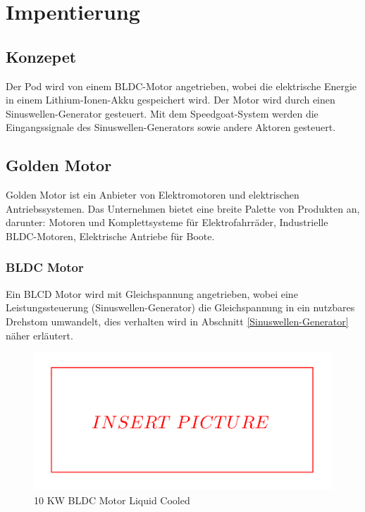 \chapter{Impentierung}

\section{Konzepet}
Der Pod wird von einem BLDC-Motor angetrieben, wobei die elektrische Energie in einem Lithium-Ionen-Akku gespeichert wird. Der Motor wird durch einen Sinuswellen-Generator gesteuert. Mit dem Speedgoat-System werden die Eingangssignale des Sinuswellen-Generators sowie andere Aktoren gesteuert.

\section{Golden Motor}
\label{Golden_Motor}
Golden Motor ist ein Anbieter von Elektromotoren und elektrischen Antriebssystemen. Das Unternehmen bietet eine breite Palette von Produkten an, darunter:
Motoren und Komplettsysteme für Elektrofahrräder, Industrielle BLDC-Motoren, Elektrische Antriebe für Boote.


\subsection{BLDC Motor}
\label{BLDC_Motor}
Ein BLCD Motor wird mit Gleichspannung angetrieben, wobei eine Leistungssteuerung (Sinuswellen-Generator) die Gleichspannung in ein nutzbares Drehstom umwandelt, dies verhalten wird in Abschnitt \ref{Sinuswellen-Generator} näher erläutert.
\newline


\begin{figure}[!ht]
	\begin{center}
		\includegraphics[width=\textwidth]{img/2_imp/insert_pic.png}
		\caption{10 KW BLDC Motor Liquid Cooled}
		\label{img_2_2:motor}
	\end{center}
\end{figure}

